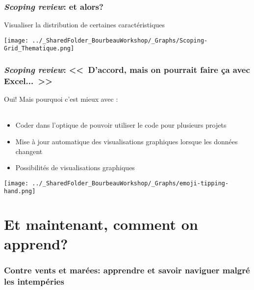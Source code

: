 \documentclass{beamer}
\begin{document}
    

    \begin{frame}
    
      \frametitle{\emph{Scoping review}: et \R alors?} \vspace{1cm}
      
      Visualiser la distribution de certaines caractéristiques
      
     \begin{center}
         \texttt{[image: ../\_SharedFolder\_BourbeauWorkshop/\_Graphs/Scoping-Grid\_Thematique.png]}
        \end{center} 
      
          
    \end{frame} 
    

    \begin{frame}
    
      \frametitle{\emph{Scoping review}: <<~D'accord, mais on pourrait faire ça avec Excel...~>>} \vspace{1.5cm}
      
    Oui! Mais pourquoi c'est mieux avec \R: \\~\\
    
        \begin{itemize}
          \item{Coder dans l'optique de pouvoir utiliser le code pour plusieurs projets}
          \item{Mise à jour automatique des visualisations graphiques lorsque les données changent}
          \item{Possibilités de visualisations graphiques}
        \end{itemize}
	
	  \begin{flushright}
     	    \texttt{[image: ../\_SharedFolder\_BourbeauWorkshop/\_Graphs/emoji-tipping-hand.png]}
    \end{flushright} 
          
    \end{frame}  
    

\section{Et maintenant, comment on apprend?}

    \begin{frame}
    
        \frametitle{Contre vents et marées: apprendre \R et savoir naviguer malgré les intempéries} \vspace{1cm}
    
    \end{frame}
    
\end{document}
